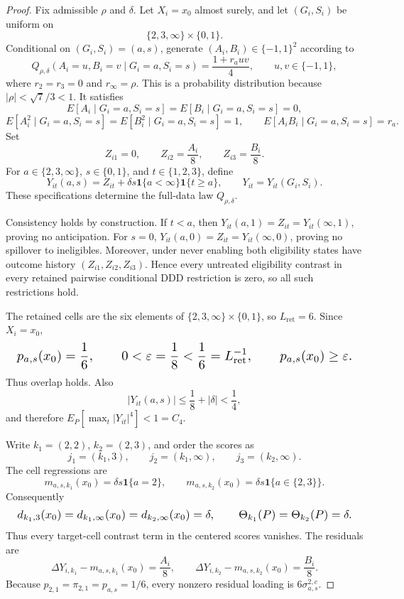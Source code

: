 \documentclass{article}
\begin{document}
\begin{proof}
Fix admissible \(\rho\) and \(\delta\). Let \(X_i=x_0\) almost surely, and let \((G_i,S_i)\) be uniform on
\[
 \{2,3,\infty\}\times\{0,1\}.
\]
Conditional on \((G_i,S_i)=(a,s)\), generate \((A_i,B_i)\in\{-1,1\}^2\) according to
\[
 Q_{\rho,\delta}(A_i=u,B_i=v\mid G_i=a,S_i=s)
 =\frac{1+r_a uv}{4},
 \qquad u,v\in\{-1,1\},
\]
where \(r_2=r_3=0\) and \(r_\infty=\rho\). This is a probability distribution because \(|\rho|<\sqrt7/3<1\). It satisfies
\[
 E[A_i\mid G_i=a,S_i=s]=E[B_i\mid G_i=a,S_i=s]=0,
\]
\[
 E[A_i^2\mid G_i=a,S_i=s]=E[B_i^2\mid G_i=a,S_i=s]=1,
 \qquad
 E[A_iB_i\mid G_i=a,S_i=s]=r_a.
\]
Set
\[
 Z_{i1}=0,
 \qquad Z_{i2}=\frac{A_i}{8},
 \qquad Z_{i3}=\frac{B_i}{8}.
\]
For \(a\in\{2,3,\infty\}\), \(s\in\{0,1\}\), and \(t\in\{1,2,3\}\), define
\[
 Y_{it}(a,s)
 =Z_{it}+\delta s\mathbf 1\{a<\infty\}\mathbf 1\{t\ge a\},
 \qquad
 Y_{it}=Y_{it}(G_i,S_i).
\]
These specifications determine the full-data law \(Q_{\rho,\delta}\).

Consistency holds by construction. If \(t<a\), then \(Y_{it}(a,1)=Z_{it}=Y_{it}(\infty,1)\), proving no anticipation. For \(s=0\), \(Y_{it}(a,0)=Z_{it}=Y_{it}(\infty,0)\), proving no spillover to ineligibles. Moreover, under never enabling both eligibility states have outcome history \((Z_{i1},Z_{i2},Z_{i3})\). Hence every untreated eligibility contrast in every retained pairwise conditional DDD restriction is zero, so all such restrictions hold.

The retained cells are the six elements of \(\{2,3,\infty\}\times\{0,1\}\), so \(L_{\mathrm{ret}}=6\). Since \(X_i=x_0\),
\[
\makebox[\linewidth][c]{\resizebox{0.98\linewidth}{!}{\(\displaystyle p_{a,s}(x_0)=\frac16,
 \qquad
 0<\varepsilon=\frac18<\frac16=L_{\mathrm{ret}}^{-1},
 \qquad
 p_{a,s}(x_0)\ge\varepsilon.\)}}
\]
Thus overlap holds. Also
\[
 |Y_{it}(a,s)|\le\frac18+|\delta|<\frac14,
\]
and therefore \(E_P[\max_t|Y_{it}|^4]<1=C_4\).

Write \(k_1=(2,2)\), \(k_2=(2,3)\), and order the scores as
\[
 j_1=(k_1,3),
 \qquad j_2=(k_1,\infty),
 \qquad j_3=(k_2,\infty).
\]
The cell regressions are
\[
 m_{a,s,k_1}(x_0)=\delta s\mathbf 1\{a=2\},
 \qquad
 m_{a,s,k_2}(x_0)=\delta s\mathbf 1\{a\in\{2,3\}\}.
\]
Consequently
\[
\makebox[\linewidth][c]{\resizebox{0.98\linewidth}{!}{\(\displaystyle d_{k_1,3}(x_0)=d_{k_1,\infty}(x_0)
 =d_{k_2,\infty}(x_0)=\delta,
 \qquad
 \Theta_{k_1}(P)=\Theta_{k_2}(P)=\delta.\)}}
\]
Thus every target-cell contrast term in the centered scores vanishes. The residuals are
\[
 \Delta Y_{i,k_1}-m_{a,s,k_1}(x_0)=\frac{A_i}{8},
 \qquad
 \Delta Y_{i,k_2}-m_{a,s,k_2}(x_0)=\frac{B_i}{8}.
\]
Because \(p_{2,1}=\pi_{2,1}=p_{a,s}=1/6\), every nonzero residual loading is \(6\sigma_{a,s}^{2,c}\).


\end{proof}
\end{document}
